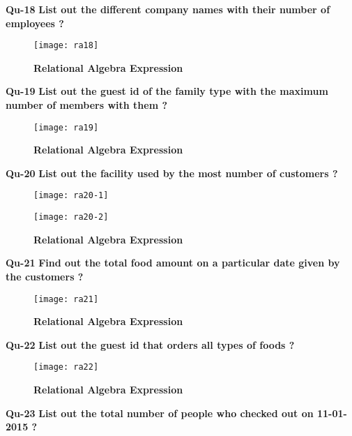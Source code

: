 \documentclass[a4,12pt]{report}
\begin{document}
\newpage
\textbf{Qu-18} \textbf{ List out the different company names with their number of employees ? }\\

\begin{figure}[hbtp]
\centering
\texttt{[image: ra18]}
\caption{\textbf{{\color{red}Relational Algebra Expression}}}
\end{figure}

\textbf{Qu-19} \textbf{ List out the guest id of the family type with the maximum number of members with them ? }\\

\begin{figure}[hbtp]
\centering
\texttt{[image: ra19]}
\caption{\textbf{{\color{red}Relational Algebra Expression}}}
\end{figure}

\newpage
\textbf{Qu-20} \textbf{ List out the facility used by the most number of customers ? }\\

\begin{figure}[hbtp]
\centering
\texttt{[image: ra20-1]}
\caption{\textbf{{\color{red}}}}
\end{figure}
\begin{figure}[hbtp]
\centering
\texttt{[image: ra20-2]}
\caption{\textbf{{\color{red}Relational Algebra Expression}}}
\end{figure}

\textbf{Qu-21} \textbf{ Find out the total food amount on a particular date given by the customers ? }\\

\begin{figure}[hbtp]
\centering
\texttt{[image: ra21]}
\caption{\textbf{{\color{red}Relational Algebra Expression}}}
\end{figure}

\newpage
\textbf{Qu-22} \textbf{ List out the guest id that orders all types of foods ? }\\

\begin{figure}[hbtp]
\centering
\texttt{[image: ra22]}
\caption{\textbf{{\color{red}Relational Algebra Expression}}}
\end{figure}

\textbf{Qu-23} \textbf{ List out the total number of people who checked out on 11-01-2015 ?}\\
\end{document}
